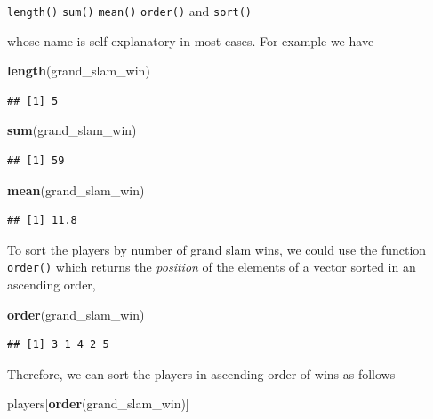 \documentclass[12pt,]{krantz}
\newenvironment{Shaded}{\begin{snugshade}}{\end{snugshade}}
\newcommand{\KeywordTok}[1]{\textcolor[rgb]{0.27,0.27,0.27}{\textbf{#1}}}
\newcommand{\NormalTok}[1]{#1}
\begin{document}
\texttt{length()} \texttt{sum()} \texttt{mean()} \texttt{order()} and
\texttt{sort()}

whose name is self-explanatory in most cases. For example we have

\begin{Shaded}
\begin{Highlighting}[]
\KeywordTok{length}\NormalTok{(grand_slam_win)}
\end{Highlighting}
\end{Shaded}

\begin{verbatim}
## [1] 5
\end{verbatim}

\begin{Shaded}
\begin{Highlighting}[]
\KeywordTok{sum}\NormalTok{(grand_slam_win)}
\end{Highlighting}
\end{Shaded}

\begin{verbatim}
## [1] 59
\end{verbatim}

\begin{Shaded}
\begin{Highlighting}[]
\KeywordTok{mean}\NormalTok{(grand_slam_win)}
\end{Highlighting}
\end{Shaded}

\begin{verbatim}
## [1] 11.8
\end{verbatim}

To sort the players by number of grand slam wins, we could use the
function \texttt{order()} which returns the \emph{position} of the
elements of a vector sorted in an ascending order,

\begin{Shaded}
\begin{Highlighting}[]
\KeywordTok{order}\NormalTok{(grand_slam_win)}
\end{Highlighting}
\end{Shaded}

\begin{verbatim}
## [1] 3 1 4 2 5
\end{verbatim}

Therefore, we can sort the players in ascending order of wins as follows

\begin{Shaded}
\begin{Highlighting}[]
\NormalTok{players[}\KeywordTok{order}\NormalTok{(grand_slam_win)]}
\end{Highlighting}
\end{Shaded}
\end{document}
